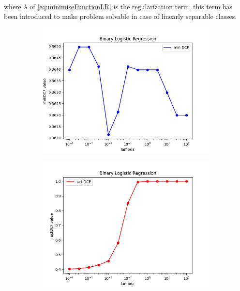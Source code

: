 where \(\lambda\) of \autoref{eq:minimiseFunctionLR} is the regularization term, this term has been introduced to make problem
solvable in case of linearly separable classes.

\begin{figure}[h!]
    \centering
    \begin{subfigure}[b]{0.40\linewidth}
        \includegraphics[width=\linewidth]{Lab/08. Lab 08/Images/01. BLR - minDCF}
        \label{fig:BLRminDCF}
    \end{subfigure}
    \begin{subfigure}[b]{0.40\linewidth}
        \includegraphics[width=\linewidth]{Lab/08. Lab 08/Images/02. BLR - actDCF}
        \label{fig:BLRactDCF}

\end{subfigure}
\end{figure}
